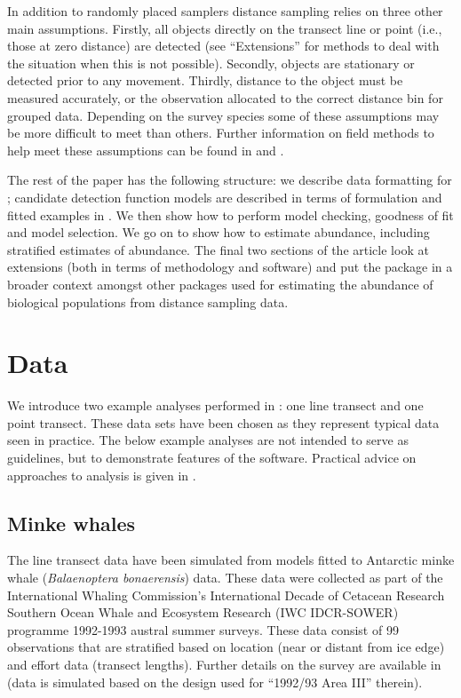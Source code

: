 \documentclass[article]{jss}\usepackage[]{graphicx}\usepackage[]{color}
\begin{document}
In addition to randomly placed samplers distance sampling relies on three other main assumptions. Firstly, all objects directly on the transect line or point (i.e., those at zero distance) are detected (see ``Extensions'' for methods to deal with the situation when this is not possible). Secondly, objects are stationary or detected prior to any movement. Thirdly, distance to the object must be measured accurately, or the observation allocated to the correct distance bin for grouped data. Depending on the survey species some of these assumptions may be more difficult to meet than others. Further information on field methods to help meet these assumptions can be found in \cite{Buckland:2001vm} and \cite{buckland2015distance}.

The rest of the paper has the following structure: we describe data formatting for ; candidate detection function models are described in terms of formulation and fitted examples in . We then show how to perform model checking, goodness of fit and model selection. We go on to show how to estimate abundance, including stratified estimates of abundance. The final two sections of the article look at extensions (both in terms of methodology and software) and put the package in a broader context amongst other  packages used for estimating the abundance of biological populations from distance sampling data.

\section{Data}

We introduce two example analyses performed in : one line transect and one point transect. These data sets have been chosen as they represent typical data seen in practice. The below example analyses are not intended to serve as guidelines, but to demonstrate features of the software. Practical advice on approaches to analysis is given in \cite{Thomas:2010cf}.

\subsection{Minke whales}

The line transect data have been simulated from models fitted to Antarctic minke whale (\textit{Balaenoptera bonaerensis}) data. These data were collected as part of the International Whaling Commission's International Decade of Cetacean Research Southern Ocean Whale and Ecosystem Research (IWC IDCR-SOWER) programme 1992-1993 austral summer surveys. These data consist of 99 observations that are stratified based on location (near or distant from ice edge) and effort data (transect lengths). Further details on the survey are available in \cite{Branch:2001ua} (data is simulated based on the design used for ``1992/93 Area III'' therein).
\end{document}
